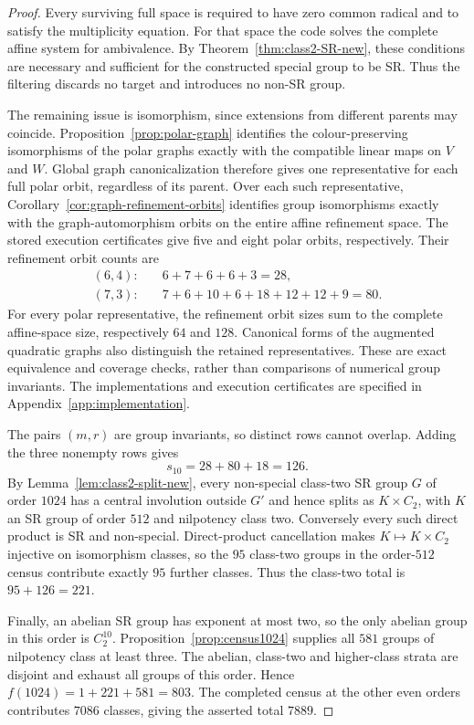 \documentclass[11pt,a4paper]{amsart}
\theoremstyle{definition}
\theoremstyle{remark}
\numberwithin{equation}{section}
\begin{document}
\begin{proof}
Every surviving full space is required to have zero common radical
and to satisfy the multiplicity equation. For that space the code
solves the complete affine system for ambivalence. By
Theorem~\ref{thm:class2-SR-new}, these conditions are necessary and
sufficient for the constructed special group to be SR. Thus the
filtering discards no target and introduces no non-SR group.

The remaining issue is isomorphism, since extensions from different
parents may coincide. Proposition~\ref{prop:polar-graph} identifies
the colour-preserving isomorphisms of the polar graphs exactly
with the compatible linear maps on $V$ and $W$. Global graph
canonicalization therefore gives one representative for each full
polar orbit, regardless of its parent. Over each such representative,
Corollary~\ref{cor:graph-refinement-orbits} identifies group
isomorphisms exactly with the graph-automorphism orbits on the
entire affine refinement space. The stored execution certificates
give five and eight polar orbits, respectively. Their refinement
orbit counts are
\[
 \begin{aligned}
 (6,4):&\quad 6+7+6+6+3=28,\\
 (7,3):&\quad 7+6+10+6+18+12+12+9=80.
 \end{aligned}
\]
For every polar representative, the refinement orbit sizes sum to
the complete affine-space size, respectively $64$ and $128$.
Canonical forms of the augmented quadratic graphs also distinguish
the retained representatives. These are exact equivalence and
coverage checks, rather than comparisons of numerical group
invariants. The implementations and execution certificates are
specified in Appendix~\ref{app:implementation}.

The pairs $(m,r)$ are group invariants, so distinct rows cannot
overlap. Adding the three nonempty rows gives
\[
 s_{10}=28+80+18=126.
\]
By Lemma~\ref{lem:class2-split-new}, every non-special class-two
SR group $G$ of order $1024$ has a central involution outside $G'$
and hence splits as $K\times C_2$, with $K$ an SR group of order
$512$ and nilpotency class two. Conversely every such direct
product is SR and non-special. Direct-product cancellation makes
$K\mapsto K\times C_2$ injective on isomorphism classes, so the
$95$ class-two groups in the order-$512$ census contribute exactly
$95$ further classes. Thus the class-two total is $95+126=221$.

Finally, an abelian SR group has exponent at most two, so the only
abelian group in this order is $C_2^{10}$. Proposition~\ref{prop:census1024}
supplies all $581$ groups of nilpotency class at least three.
The abelian, class-two and higher-class strata are disjoint and
exhaust all groups of this order. Hence
$f(1024)=1+221+581=803$. The completed census at the other even
orders contributes $7086$ classes, giving the asserted total $7889$.
\end{proof}
\end{document}
